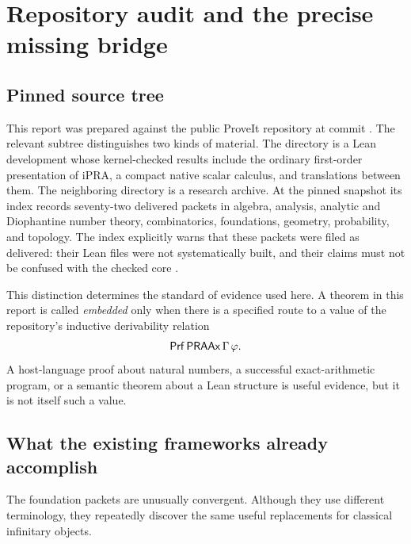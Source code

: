 \section{Repository audit and the precise missing bridge}

\subsection{Pinned source tree}

This report was prepared against the public ProveIt repository at commit
\RepoCommit.  The relevant subtree distinguishes two kinds of material.
The  directory is a Lean development whose kernel-checked
results include the ordinary first-order presentation of iPRA, a compact native
scalar calculus, and translations between them.  The neighboring
 directory is a research archive.  At the pinned snapshot its
index records seventy-two delivered packets in algebra, analysis, analytic and
Diophantine number theory, combinatorics, foundations, geometry, probability,
and topology.  The index explicitly warns that these packets were filed as
delivered: their Lean files were not systematically built, and their claims
must not be confused with the checked core \cite{ProveItRoot,PacketsIndex}.

This distinction determines the standard of evidence used here.  A theorem in
this report is called \emph{embedded} only when there is a specified route to a
value of the repository's inductive derivability relation
\[
        \mathsf{Prf}\,\mathsf{PRAAx}\,\Gamma\,\varphi.
\]
A host-language proof about natural numbers, a successful exact-arithmetic
program, or a semantic theorem about a Lean structure is useful evidence, but
it is not itself such a value.

\subsection{What the existing frameworks already accomplish}

The foundation packets are unusually convergent.  Although they use different
terminology, they repeatedly discover the same useful replacements for
classical infinitary objects.

